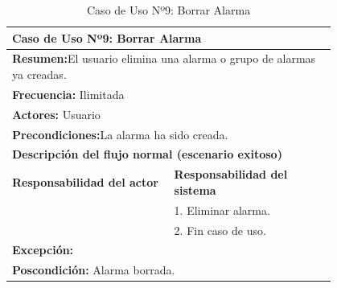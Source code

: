 \begin{table}[H]
    \centering
    \caption{Caso de Uso Nº9: Borrar Alarma}
    \vspace{10pt}
    
    \begin{tabular}{| p{0.4\linewidth} | p{0.4\linewidth} |}
        \hline
        \multicolumn{2}{|l|}{\textbf{Caso de Uso Nº9:} Borrar Alarma} \\
        \hline
        \multicolumn{2}{|l|}{\textbf{Resumen:}El usuario elimina una alarma o grupo de alarmas ya creadas.} \\
        \hline
        \multicolumn{2}{|l|}{\textbf{Frecuencia:}  Ilimitada} \\
        \hline
        \multicolumn{2}{|l|}{\textbf{Actores:}  Usuario} \\
        \hline
        \multicolumn{2}{|l|}{\textbf{Precondiciones:}La alarma ha sido creada.} \\
        \hline
        \multicolumn{2}{|l|}{\textbf{Descripción del flujo normal (escenario exitoso)} } \\
        \hline
        \textbf{Responsabilidad del actor} & \textbf{Responsabilidad del sistema}\\
            & 1. Eliminar alarma.\\
            & 2. Fin caso de uso. \\
        \hline
        \multicolumn{2}{|p{0.8\linewidth}|}{
                \textbf{Excepción:}} \\
        \hline
        \multicolumn{2}{|l|}{\textbf{Poscondición:}  Alarma borrada.} \\
        \hline
    \end{tabular}

    \label{table:9}
\end{table}

